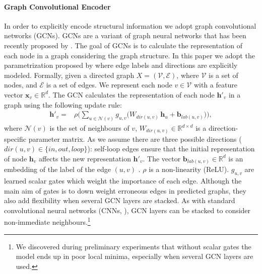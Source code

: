 \documentclass[11pt,a4paper,dvipsnames]{article}
\begin{document}
\paragraph{Graph Convolutional Encoder}
In order to explicitly encode structural information we adopt graph convolutional networks (GCNs).
GCNs are a variant of graph neural networks \cite{scarselli2009graph} that has been recently proposed by .
The goal of GCNs is to calculate the representation of each node in a graph considering the graph structure.
In this paper we adopt the parametrization proposed by  where edge labels and directions are explicitly modeled.
Formally, given a directed graph $X = (\mathcal{V}, \mathcal{E})$, where $\mathcal{V}$ is a set of nodes, and $\mathcal{E}$ is a set of edges. 
We represent each node $v \in \mathcal{V}$ with a feature vector $\mathbf{x}_v \in \mathbb{R}^d$.
The GCN calculates the representation of each node $\mathbf{h}'_v$ in a graph using the following update rule:
\vspace{-0.5em}
\begin{align*}\label{eq:gcn}
\mathbf{h}'_v\!\!=&\rho\Big(\!\!\!\sum_{u \in \mathcal{N}(v)} \!\!\! g_{u, v} \big(W_{dir(u, v)} \, \mathbf{h}_u + \mathbf{b}_{lab(u, v)}\big)\Big),
\end{align*}
\noindent
where $\mathcal{N}(v)$ is the set of neighbours of $v$, $W_{dir(u, v)} \in \mathbb{R}^{d \times d}$ is a direction-specific parameter matrix. 
As  we assume there are three possible directions ($dir(u, v) \in \{in, out, loop\}$): self-loop edges ensure that the initial representation of node $\mathbf{h}_v$ affects the new representation $\mathbf{h}'_v$. 
The vector $\mathbf{b}_{lab(u, v)} \in \mathbb{R}^d$ is an embedding of the label of the edge $(u,v)$ 
. $\rho$ is a non-linearity (ReLU).
$g_{u, v}$ are learned scalar gates which weight the importance of each edge.
Although the main aim of gates is to down weight erroneous edges in predicted graphs, they also add flexibility when several GCN layers are stacked.
As with standard convolutional neural networks (CNNs, \cite{lecun-01a}), GCN layers can be stacked to consider non-immediate neighbours.\footnote{We discovered during preliminary experiments that without scalar gates the model ends up in poor local minima, especially when several GCN layers are used.} 
\end{document}
